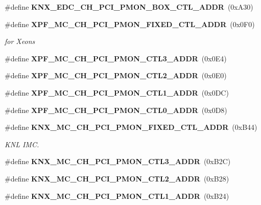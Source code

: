 \begin{DoxyCompactItemize}
\#define {\bfseries K\+N\+X\+\_\+\+E\+D\+C\+\_\+\+C\+H\+\_\+\+P\+C\+I\+\_\+\+P\+M\+O\+N\+\_\+\+B\+O\+X\+\_\+\+C\+T\+L\+\_\+\+A\+D\+DR}~(0x\+A30)
\item 
\mbox{\label{types_8h_a36d9687a5fb8d842a1375ead04bca5bd}} 
\#define \textbf{ X\+P\+F\+\_\+\+M\+C\+\_\+\+C\+H\+\_\+\+P\+C\+I\+\_\+\+P\+M\+O\+N\+\_\+\+F\+I\+X\+E\+D\+\_\+\+C\+T\+L\+\_\+\+A\+D\+DR}~(0x0\+F0)
\begin{DoxyCompactList}\small\item\em for Xeons \end{DoxyCompactList}\item 
\mbox{\label{types_8h_ae8a4ec13c810a889234fb474dc7ee432}} 
\#define {\bfseries X\+P\+F\+\_\+\+M\+C\+\_\+\+C\+H\+\_\+\+P\+C\+I\+\_\+\+P\+M\+O\+N\+\_\+\+C\+T\+L3\+\_\+\+A\+D\+DR}~(0x0\+E4)
\item 
\mbox{\label{types_8h_ad2a500c866f5ea11679c8001ac94ef5c}} 
\#define {\bfseries X\+P\+F\+\_\+\+M\+C\+\_\+\+C\+H\+\_\+\+P\+C\+I\+\_\+\+P\+M\+O\+N\+\_\+\+C\+T\+L2\+\_\+\+A\+D\+DR}~(0x0\+E0)
\item 
\mbox{\label{types_8h_a2a41b3d31e62e0d1eaa91044f430abb6}} 
\#define {\bfseries X\+P\+F\+\_\+\+M\+C\+\_\+\+C\+H\+\_\+\+P\+C\+I\+\_\+\+P\+M\+O\+N\+\_\+\+C\+T\+L1\+\_\+\+A\+D\+DR}~(0x0\+D\+C)
\item 
\mbox{\label{types_8h_a56947b4009312c452839d1c5adeb4ead}} 
\#define {\bfseries X\+P\+F\+\_\+\+M\+C\+\_\+\+C\+H\+\_\+\+P\+C\+I\+\_\+\+P\+M\+O\+N\+\_\+\+C\+T\+L0\+\_\+\+A\+D\+DR}~(0x0\+D8)
\item 
\mbox{\label{types_8h_a8bdbd0d702b86c59f729b83a63b65b7e}} 
\#define \textbf{ K\+N\+X\+\_\+\+M\+C\+\_\+\+C\+H\+\_\+\+P\+C\+I\+\_\+\+P\+M\+O\+N\+\_\+\+F\+I\+X\+E\+D\+\_\+\+C\+T\+L\+\_\+\+A\+D\+DR}~(0x\+B44)
\begin{DoxyCompactList}\small\item\em K\+NL I\+MC. \end{DoxyCompactList}\item 
\mbox{\label{types_8h_a9be9c533ba45a5f266fcf6598bf4cb95}} 
\#define {\bfseries K\+N\+X\+\_\+\+M\+C\+\_\+\+C\+H\+\_\+\+P\+C\+I\+\_\+\+P\+M\+O\+N\+\_\+\+C\+T\+L3\+\_\+\+A\+D\+DR}~(0x\+B2\+C)
\item 
\mbox{\label{types_8h_ab34628d3ae4f32c01c4547584be43d54}} 
\#define {\bfseries K\+N\+X\+\_\+\+M\+C\+\_\+\+C\+H\+\_\+\+P\+C\+I\+\_\+\+P\+M\+O\+N\+\_\+\+C\+T\+L2\+\_\+\+A\+D\+DR}~(0x\+B28)
\item 
\mbox{\label{types_8h_a5cf685dc3454b0d9167d38a53980a15c}} 
\#define {\bfseries K\+N\+X\+\_\+\+M\+C\+\_\+\+C\+H\+\_\+\+P\+C\+I\+\_\+\+P\+M\+O\+N\+\_\+\+C\+T\+L1\+\_\+\+A\+D\+DR}~(0x\+B24)

\end{DoxyCompactItemize}
